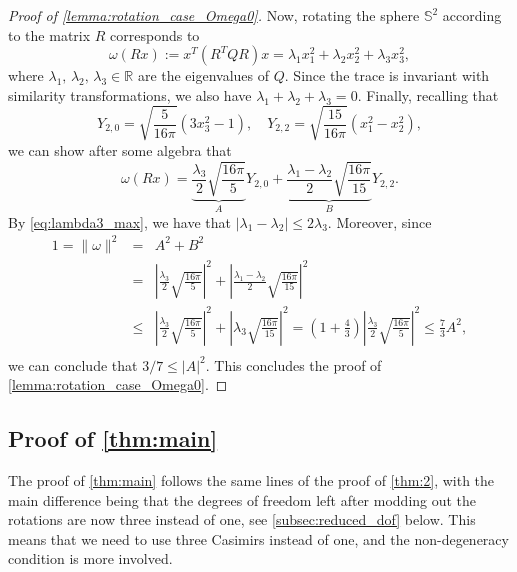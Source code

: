 \documentclass{amsart}
\def\erre{{\mathbb{R}}}
\def\esse{{\mathbb{S}}}
\begin{document}
\begin{proof}[Proof of \cref{lemma:rotation_case_Omega0}]
Now, rotating the sphere $\esse^2$ according to the matrix $R$ corresponds to
\begin{equation*}
    \omega(Rx):=x^T(R^TQR)x=\lambda_1x_1^2+\lambda_2x_2^2+\lambda_3x_3^2,
\end{equation*}
where $\lambda_1,\,\lambda_2,\,\lambda_3\in\erre$ are the eigenvalues of $Q$. Since the trace is invariant with similarity transformations, we also have $\lambda_1+\lambda_2+\lambda_3=0$. Finally, recalling that
\begin{equation*}
    Y_{2,0}=\sqrt{\frac{5}{16\pi}}(3x_3^2-1),\quad Y_{2,2}=\sqrt{\frac{15}{16\pi}}(x_1^2-x_2^2),
\end{equation*}
we can show after some algebra that
\begin{equation}
    \omega(Rx)=\underbrace{\frac{\lambda_3}{2}\sqrt{\frac{16\pi}{5}}}_{A}Y_{2,0}+\underbrace{\frac{\lambda_1-\lambda_2}{2}\sqrt{\frac{16\pi}{15}}}_{B}Y_{2,2}.
    \label{eq:relation_AB_lambda}
\end{equation}
By \eqref{eq:lambda3_max}, we have that $|\lambda_1-\lambda_2|\le 2\lambda_3$.
Moreover, since 
\begin{eqnarray*}
    1=\|\omega\|^2&=&A^2+B^2\\
    &=&\left|\frac{\lambda_3}{2}\sqrt{\frac{16\pi}{5}}\right|^2+\left|\frac{\lambda_1-\lambda_2}{2}\sqrt{\frac{16\pi}{15}}\right|^2\\
    &\le&\left|\frac{\lambda_3}{2}\sqrt{\frac{16\pi}{5}}\right|^2+\left|\lambda_3\sqrt{\frac{16\pi}{15}}\right|^2=\left(1+\frac{4}{3}\right)\left|\frac{\lambda_3}{2}\sqrt{\frac{16\pi}{5}}\right|^2\le \frac{7}{3}A^2,\\
\end{eqnarray*}
we can conclude that $3/7\le |A|^2$. This concludes the proof of \cref{lemma:rotation_case_Omega0}.
\end{proof}
\subsection{Proof of \cref{thm:main}}
The proof of \cref{thm:main} follows the same lines of the proof of \cref{thm:2}, with the main difference being that the degrees of freedom left after modding out the rotations are now three instead of one, see \cref{subsec:reduced_dof} below. This means that we need to use three Casimirs instead of one, and the non-degeneracy condition is more involved. 
\end{document}
